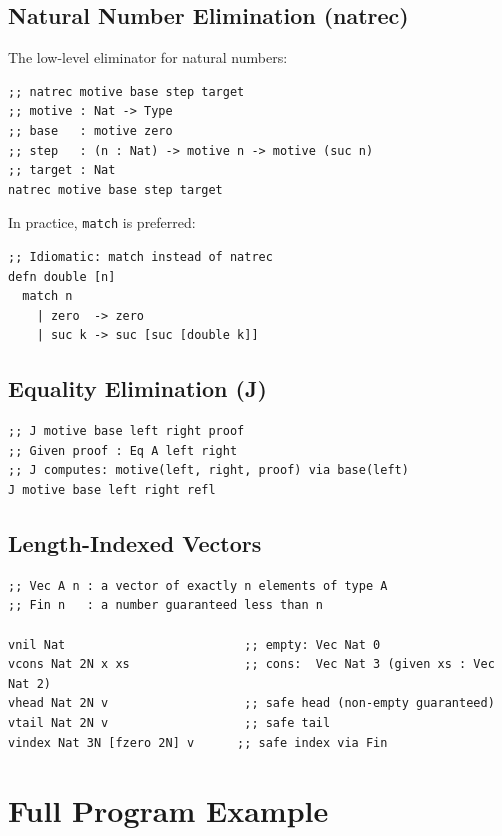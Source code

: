 \documentclass[11pt]{article}
\begin{document}
\subsection{Natural Number Elimination (natrec)}
\label{sec:org57d8141}

The low-level eliminator for natural numbers:

\begin{verbatim}
;; natrec motive base step target
;; motive : Nat -> Type
;; base   : motive zero
;; step   : (n : Nat) -> motive n -> motive (suc n)
;; target : Nat
natrec motive base step target
\end{verbatim}

In practice, \texttt{match} is preferred:

\begin{verbatim}
;; Idiomatic: match instead of natrec
defn double [n]
  match n
    | zero  -> zero
    | suc k -> suc [suc [double k]]
\end{verbatim}
\subsection{Equality Elimination (J)}
\label{sec:org2d7a57c}

\begin{verbatim}
;; J motive base left right proof
;; Given proof : Eq A left right
;; J computes: motive(left, right, proof) via base(left)
J motive base left right refl
\end{verbatim}
\subsection{Length-Indexed Vectors}
\label{sec:org5a7718c}

\begin{verbatim}
;; Vec A n : a vector of exactly n elements of type A
;; Fin n   : a number guaranteed less than n

vnil Nat                         ;; empty: Vec Nat 0
vcons Nat 2N x xs                ;; cons:  Vec Nat 3 (given xs : Vec Nat 2)
vhead Nat 2N v                   ;; safe head (non-empty guaranteed)
vtail Nat 2N v                   ;; safe tail
vindex Nat 3N [fzero 2N] v      ;; safe index via Fin
\end{verbatim}
\section{Full Program Example}
\label{sec:orgf02f979}
\end{document}

